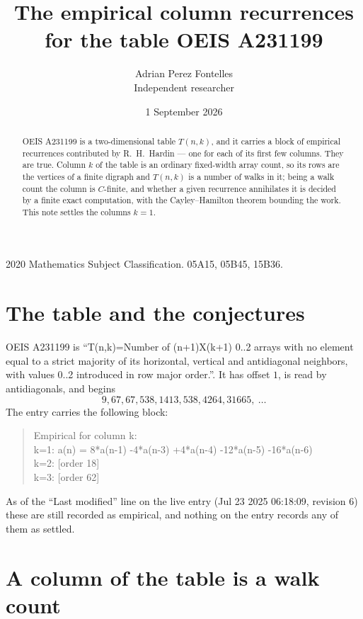 \documentclass[11pt,a4paper]{article}
\title{The empirical column recurrences for the table OEIS A231199}
\author{Adrian Perez Fontelles\\ \small Independent researcher}
\date{1 September 2026}
\theoremstyle{plain}
\theoremstyle{definition}
\begin{document}
\maketitle

\begin{abstract}
OEIS A231199 is a two-dimensional table $T(n,k)$, and it carries a block of empirical
recurrences contributed by R.~H.~Hardin --- one for each of its first few columns. They are
true. Column $k$ of the table is an ordinary fixed-width array count, so its rows are the
vertices of a finite digraph and $T(n,k)$ is a number of walks in it; being a walk count the
column is $C$-finite, and whether a given recurrence annihilates it is decided by a finite
exact computation, with the Cayley--Hamilton theorem bounding the work. This note settles the columns $k=1$.
\end{abstract}

\noindent\small 2020 Mathematics Subject Classification. 05A15, 05B45, 15B36.\normalsize

\section{The table and the conjectures}

OEIS A231199 is ``T(n,k)=Number of (n+1)X(k+1) 0..2 arrays with no element equal to a strict majority of its horizontal, vertical and antidiagonal neighbors, with values 0..2 introduced in row major order.''. It has offset $1$, is
read by antidiagonals, and begins
\[
9, 67, 67, 538, 1413, 538, 4264, 31665,\ \dots
\]
The entry carries the following block:
\begin{quote}\small
Empirical for column k:\\
k=1: a(n) = 8*a(n-1) -4*a(n-3) +4*a(n-4) -12*a(n-5) -16*a(n-6)\\
k=2: [order 18]\\
k=3: [order 62]\\
\end{quote}
As of the ``Last modified'' line on the live entry (Jul 23 2025 06:18:09, revision 6) these are still
recorded as empirical, and nothing on the entry records any of them as settled.

\section{A column of the table is a walk count}
\end{document}
